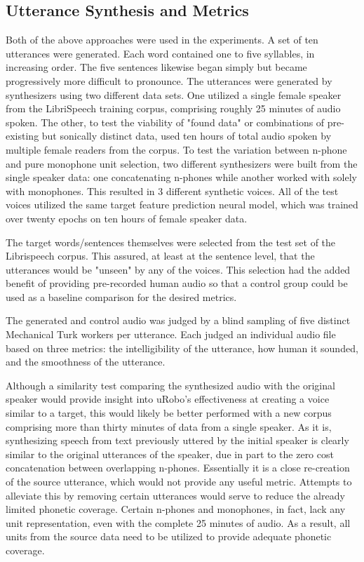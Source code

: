 \documentclass[10pt, journal, compsoc]{IEEEtran}
\begin{document}
\subsection{Utterance Synthesis and Metrics}
Both of the above approaches were used in the experiments. A set of ten utterances were generated. Each word contained one to five syllables, in increasing order. The five sentences likewise began simply but became progressively more difficult to pronounce. The utterances were generated by synthesizers using two different data sets. One utilized a single female speaker from the LibriSpeech training corpus, comprising roughly 25 minutes of audio spoken. The other, to test the viability of "found data" or combinations of pre-existing but sonically distinct data, used ten hours of total audio spoken by multiple female readers from the corpus. To test the variation between n-phone and pure monophone unit selection, two different synthesizers were built from the single speaker data: one concatenating n-phones while another worked with solely with monophones. This resulted in 3 different synthetic voices. All of the test voices utilized the same target feature prediction neural model, which was trained over twenty epochs on ten hours of female speaker data.\par 
The target words/sentences themselves were selected from the test set of the Librispeech corpus. This assured, at least at the sentence level, that the utterances would be "unseen" by any of the voices. This selection had the added benefit of providing pre-recorded human audio so that a control group could be used as a baseline comparison for the desired metrics. \par
The generated and control audio was judged by a blind sampling of five distinct Mechanical Turk workers per utterance. Each judged an individual audio file based on three metrics: the intelligibility of the utterance, how human it sounded, and the smoothness of the utterance.\par
Although a similarity test comparing the synthesized audio with the original speaker would provide insight into uRobo's effectiveness at creating a voice similar to a target, this would likely be better performed with a new corpus comprising more than thirty minutes of data from a single speaker. As it is, synthesizing speech from text previously uttered by the initial speaker is clearly similar to the original utterances of the speaker, due in part to the zero cost concatenation between overlapping n-phones. Essentially it is a close re-creation of the source utterance, which would not provide any useful metric. Attempts to alleviate this by removing certain utterances would serve to reduce the already limited phonetic coverage. Certain n-phones and monophones, in fact, lack any unit representation, even with the complete 25 minutes of audio. As a result, all units from the source data need to be utilized to provide adequate phonetic coverage.
\end{document}
